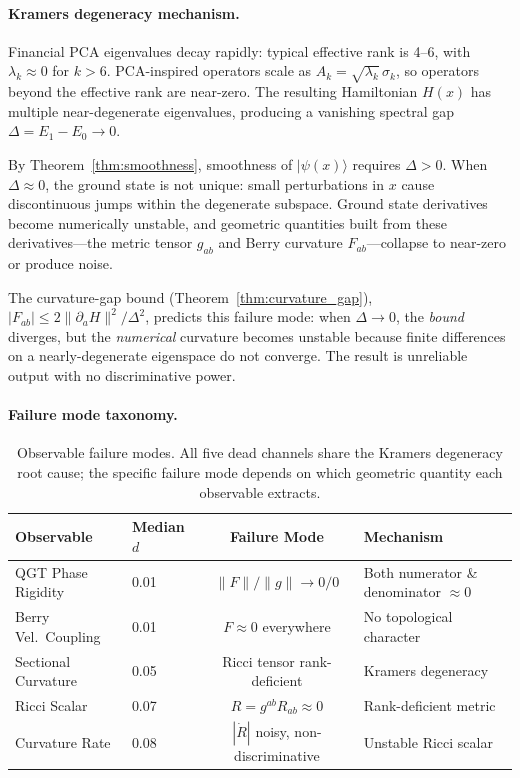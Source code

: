 \documentclass[3p]{elsarticle}
\newcommand{\ket}[1]{|#1\rangle}
\begin{document}
\paragraph{Kramers degeneracy mechanism.}
Financial PCA eigenvalues decay rapidly: typical effective rank is
4--6, with $\lambda_k \approx 0$ for $k > 6$.  PCA-inspired operators
scale as $A_k = \sqrt{\lambda_k}\,\sigma_k$, so operators beyond the
effective rank are near-zero.  The resulting Hamiltonian $H(x)$ has
multiple near-degenerate eigenvalues, producing a vanishing spectral
gap $\Delta = E_1 - E_0 \to 0$.

By Theorem~\ref{thm:smoothness}, smoothness of $\ket{\psi(x)}$ requires
$\Delta > 0$.  When $\Delta \approx 0$, the ground state is not unique:
small perturbations in $x$ cause discontinuous jumps within the degenerate
subspace.  Ground state derivatives become numerically unstable, and
geometric quantities built from these derivatives---the metric tensor
$g_{ab}$ and Berry curvature $F_{ab}$---collapse to near-zero or produce
noise.

The curvature-gap bound (Theorem~\ref{thm:curvature_gap}),
$|F_{ab}| \leq 2\|\partial_a H\|^2 / \Delta^2$, predicts this failure
mode: when $\Delta \to 0$, the \emph{bound} diverges, but the
\emph{numerical} curvature becomes unstable because finite differences
on a nearly-degenerate eigenspace do not converge.  The result is
unreliable output with no discriminative power.

\paragraph{Failure mode taxonomy.}

\begin{table}[htb]
\centering
\caption{Observable failure modes.  All five dead channels share the
  Kramers degeneracy root cause; the specific failure mode depends on
  which geometric quantity each observable extracts.}
\label{tab:dead_signals}
\small
\begin{tabular}{llcl}
\toprule
Observable & Median $d$ & Failure Mode & Mechanism \\
\midrule
QGT Phase Rigidity     & 0.01 & $\|F\|/\|g\| \to 0/0$ & Both numerator \& denominator $\approx 0$ \\
Berry Vel.\ Coupling   & 0.01 & $F \approx 0$ everywhere & No topological character \\
Sectional Curvature    & 0.05 & Ricci tensor rank-deficient & Kramers degeneracy \\
Ricci Scalar           & 0.07 & $R = g^{ab}R_{ab} \approx 0$ & Rank-deficient metric \\
Curvature Rate         & 0.08 & $|\dot{R}|$ noisy, non-discriminative & Unstable Ricci scalar \\
\bottomrule
\end{tabular}
\end{table}
\end{document}
